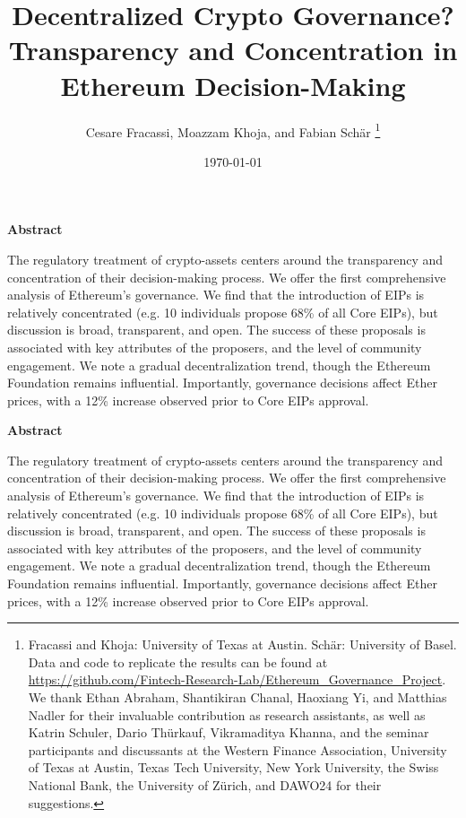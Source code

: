 \documentclass[No]{AEA}
\title{Decentralized Crypto Governance? \\ Transparency and Concentration in Ethereum Decision-Making}
\author{Cesare Fracassi, Moazzam Khoja, and Fabian Sch\"{a}r \thanks{Fracassi and Khoja: University of Texas at Austin. Sch\"{a}r: University of Basel. Data and code to replicate the results can be found at \url{https://github.com/Fintech-Research-Lab/Ethereum_Governance_Project}. We thank Ethan Abraham, Shantikiran Chanal, Haoxiang Yi, and Matthias Nadler for their invaluable contribution as research assistants, as well as Katrin Schuler, Dario Thürkauf, Vikramaditya Khanna, and the seminar participants and discussants at the Western Finance Association, University of Texas at Austin, Texas Tech University, New York University, the Swiss National Bank, the University of Zürich, and DAWO24 for their suggestions.}}
\date{\today}
\begin{document}
\doublespacing

 \maketitle 

\begin{center}
    \textbf{Abstract}\\
\end{center}
The regulatory treatment of crypto-assets centers around the transparency and concentration of their decision-making process. We offer the first comprehensive analysis of Ethereum’s governance. We find that the introduction of EIPs is relatively concentrated (e.g. 10 individuals propose 68\% of all Core EIPs), but discussion is broad, transparent, and open. The success of these proposals is associated with key attributes of the proposers, and the level of community engagement. We note a gradual decentralization trend, though the Ethereum Foundation remains influential. Importantly, governance decisions affect Ether prices, with a 12\% increase observed prior to Core EIPs approval.




\clearpage

\begin{titlingpage}


\emptythanks
\author{}

\maketitle

\begin{center}
    \textbf{Abstract}\\
\end{center}
The regulatory treatment of crypto-assets centers around the transparency and concentration of their decision-making process. We offer the first comprehensive analysis of Ethereum’s governance. We find that the introduction of EIPs is relatively concentrated (e.g. 10 individuals propose 68\% of all Core EIPs), but discussion is broad, transparent, and open. The success of these proposals is associated with key attributes of the proposers, and the level of community engagement. We note a gradual decentralization trend, though the Ethereum Foundation remains influential. Importantly, governance decisions affect Ether prices, with a 12\% increase observed prior to Core EIPs approval.
\clearpage
 \end{titlingpage}
\end{document}
